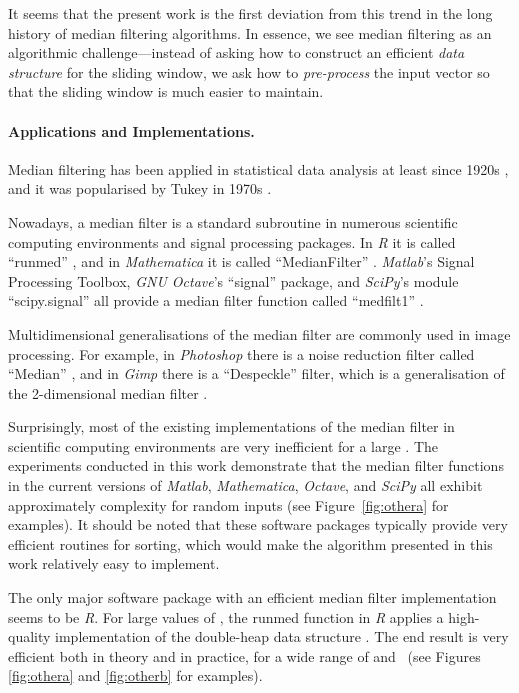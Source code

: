 \documentclass[a4paper,11pt]{article}
\newcommand{\rmfcite}{\citesoftware[p.~1507]{r-manual}}
\begin{document}
It seems that the present work is the first deviation from this trend in the long history of median filtering algorithms. In essence, we see median filtering as an algorithmic challenge---instead of asking how to construct an efficient \emph{data structure} for the sliding window, we ask how to \emph{pre-process} the input vector so that the sliding window is much easier to maintain.

\paragraph{Applications and Implementations.}

Median filtering has been applied in statistical data analysis at least since 1920s \cite{king24seasonal}, and it was popularised by Tukey in 1970s \cite[Section 7A]{tukey77eda}.

Nowadays, a median filter is a standard subroutine in numerous scientific computing environments and signal processing packages. In \emph{R} it is called ``runmed'' \rmfcite{}, and in \emph{Mathematica} it is called ``MedianFilter'' . \emph{Matlab}'s Signal Processing Toolbox, \emph{GNU Octave}'s ``signal'' package, and \emph{SciPy}'s module ``scipy.signal'' all provide a median filter function called ``medfilt1'' .

Multidimensional generalisations of the median filter are commonly used in image processing. For example, in \emph{Photoshop} there is a noise reduction filter called ``Median'' , and in \emph{Gimp} there is a ``Despeckle'' filter, which is a generalisation of the 2-dimensional median filter .

Surprisingly, most of the existing implementations of the median filter in scientific computing environments are very inefficient for a large . The experiments conducted in this work demonstrate that the median filter functions in the current versions of \emph{Matlab}, \emph{Mathematica}, \emph{Octave}, and \emph{SciPy} all exhibit approximately  complexity for random inputs (see Figure~\ref{fig:othera} for examples). It should be noted that these software packages typically provide very efficient routines for sorting, which would make the algorithm presented in this work relatively easy to implement.

The only major software package with an efficient  median filter implementation seems to be \emph{R}\@. For large values of , the runmed function in \emph{R} applies a high-quality implementation of the double-heap data structure \cite{astola89median,juhola91comparison,hardle95median-smooth}. The end result is very efficient both in theory and in practice, for a wide range of  and~ (see Figures \ref{fig:othera} and \ref{fig:otherb} for examples).
\end{document}
